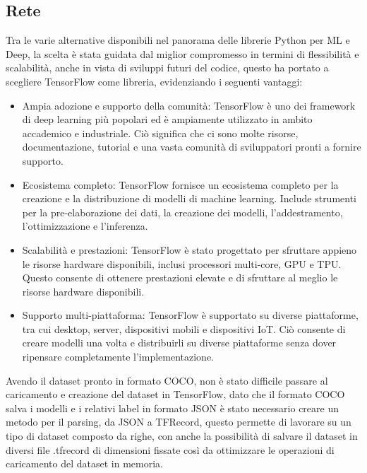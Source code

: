 \documentclass[a4paper,12pt]{report}
\begin{document}
      \subsection{Rete}
      Tra le varie alternative disponibili nel panorama delle librerie Python per ML e Deep,
      la scelta è stata guidata dal miglior compromesso in termini di flessibilità e scalabilità,
      anche in vista di sviluppi futuri del codice, questo ha portato a scegliere
      TensorFlow \cite{tensorflow} come libreria, evidenziando i seguenti vantaggi:
      \begin{itemize}
        \item Ampia adozione e supporto della comunità: TensorFlow è uno dei framework di deep learning più popolari ed è ampiamente utilizzato in ambito accademico e industriale. Ciò significa che ci sono molte risorse, documentazione, tutorial e una vasta comunità di sviluppatori pronti a fornire supporto.
        \item Ecosistema completo: TensorFlow fornisce un ecosistema completo per la creazione e la distribuzione di modelli di machine learning. Include strumenti per la pre-elaborazione dei dati, la creazione dei modelli, l'addestramento, l'ottimizzazione e l'inferenza.
        \item Scalabilità e prestazioni: TensorFlow è stato progettato per sfruttare appieno le risorse hardware disponibili, inclusi processori multi-core, GPU e TPU. Questo consente di ottenere prestazioni elevate e di sfruttare al meglio le risorse hardware disponibili.
        \item Supporto multi-piattaforma: TensorFlow è supportato su diverse piattaforme, tra cui desktop, server, dispositivi mobili e dispositivi IoT. Ciò consente di creare modelli una volta e distribuirli su diverse piattaforme senza dover ripensare completamente l'implementazione.
      \end{itemize}
      \newpage
      Avendo il dataset pronto in formato COCO, non è stato difficile passare al
      caricamento e creazione del dataset in TensorFlow, 
      dato che il formato COCO salva i modelli e i relativi label
      in formato JSON è stato necessario creare un metodo per il 
      parsing, da JSON a TFRecord, questo permette di lavorare su 
      un tipo di dataset composto da righe, con anche la possibilità
      di salvare il dataset in diversi file .tfrecord di dimensioni fissate
      così da ottimizzare le operazioni di caricamento del dataset in memoria. 
\end{document}
